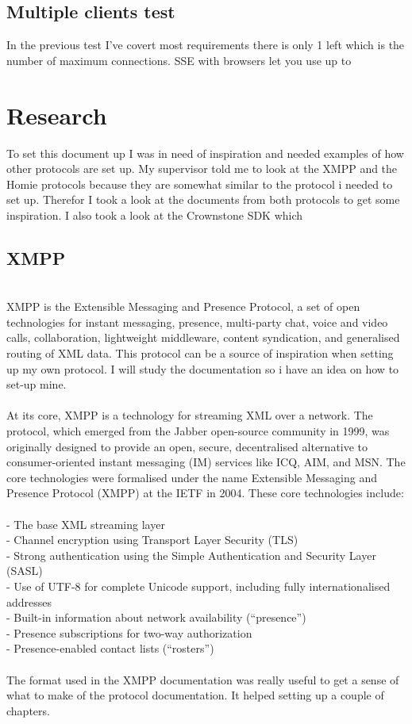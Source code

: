 \documentclass{article}
\begin{document}
\subsection{Multiple clients test}\label{mclient}
In the previous test I've covert most requirements there is only 1 left which is the number of maximum connections. SSE with browsers let you use up to 


\cleardoublepage
\section{Research}\label{sec:research} 
To set this document up I was in need of inspiration and needed examples of how other protocols are set up. My supervisor told me to look at the XMPP and the Homie protocols because they are somewhat similar to the protocol i needed to set up. Therefor I took a look at the documents from both protocols to get some inspiration. I also took a look at the Crownstone SDK which 
\\
\subsection{XMPP}\label{sec:xmpp} 
\\
XMPP is the Extensible Messaging and Presence Protocol, a set of open technologies for instant messaging, presence, multi-party chat, voice and video calls, collaboration, lightweight middleware, content syndication, and generalised routing of XML data. This protocol can be a source of inspiration when setting up my own protocol. I will study the documentation so i have an idea on how to set-up mine.\\
\\
At its core, XMPP is a technology for streaming XML over a network. The protocol, which emerged from the Jabber open-source community in 1999, was originally designed to provide an open, secure, decentralised alternative to consumer-oriented instant messaging (IM) services like ICQ, AIM, and MSN. The core technologies were formalised under the name Extensible Messaging and Presence Protocol (XMPP) at the IETF in 2004. These core technologies include:\\
\\
- The base XML streaming layer\\
- Channel encryption using Transport Layer Security (TLS)\\
- Strong authentication using the Simple Authentication and Security Layer (SASL)\\
- Use of UTF-8 for complete Unicode support, including fully internationalised addresses\\
- Built-in information about network availability (“presence”)\\
- Presence subscriptions for two-way authorization\\
- Presence-enabled contact lists (“rosters”)\\
\\
The format used in the XMPP documentation was really useful to get a sense of what to make of the protocol documentation. It helped setting up a couple of chapters. 
\end{document}
